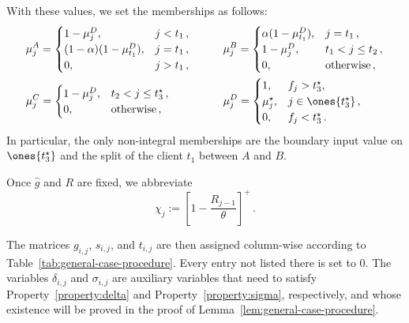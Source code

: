 With these values, we set the memberships as follows:
\begin{equation}\label{eq:membership-assignment}
    \begin{aligned}
        &\mu_j^A=
        \begin{cases}
            1-\mu_j^D, & j<t_1\,,\\
            (1-\alpha)(1-\mu_{t_1}^D), & j=t_1\,,\\
            0, & j>t_1\,,
        \end{cases}
        \qquad
        &&\mu_j^B=
        \begin{cases}
            \alpha(1-\mu_{t_1}^D), & j=t_1\,,\\
            1-\mu_j^D, & t_1<j\le t_2\,,\\
            0, & \text{otherwise}\,,
        \end{cases}
        \\
        &\mu_j^C=
        \begin{cases}
            1-\mu_j^D, & t_2<j\le t_3^\star\,,\\
            0, & \text{otherwise}\,,
        \end{cases} 
        \qquad
        &&\mu_j^D=
        \begin{cases}
            1, & f_j>t_3^\star,\\
            \mu_j^\star, & j\in\ones{t_3^\star}\,,\\
            0, & f_j<t_3^\star\,.
        \end{cases}
    \end{aligned}
\end{equation}
In particular, the only non-integral memberships are the boundary input value on $\ones{t_3^\star}$ and the split of the client $t_1$ between $A$ and $B$.

Once $\hat g$ and $R$ are fixed, we abbreviate
\begin{equation*}
    \chi_j := \left[1-\frac{R_{j-1}}{\theta}\right]^+\,.
\end{equation*}

The matrices $g_{i,j}$, $s_{i,j}$, and $t_{i,j}$ are then assigned column-wise according to Table~\ref{tab:general-case-procedure}. Every entry not listed there is set to $0$. The variables $\delta_{i,j}$ and $\sigma_{i,j}$ are auxiliary variables that need to satisfy Property~\ref{property:delta} and Property~\ref{property:sigma}, respectively, and whose existence will be proved in the proof of Lemma~\ref{lem:general-case-procedure}.

